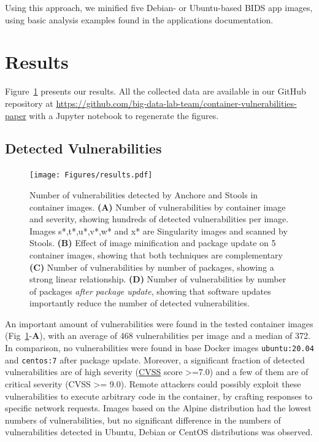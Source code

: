 \documentclass[a4paper,num-refs]{oup-contemporary}
\begin{document}
Using this approach, we minified five Debian- or Ubuntu-based BIDS app images,
using basic analysis examples found in the applications documentation.

\section{Results}

Figure~\ref{fig:vulnerabilities} presents our results. All the collected
data are available in our GitHub repository at
\url{https://github.com/big-data-lab-team/container-vulnerabilities-paper}
with a Jupyter notebook to regenerate the figures. 

\subsection{Detected Vulnerabilities}


\begin{figure}
\texttt{[image: Figures/results.pdf]}
\caption{\label{fig:vulnerabilities} Number of vulnerabilities detected by
Anchore and Stools in container images. \textbf{(A)} Number of vulnerabilities by
container image and severity, showing hundreds of detected vulnerabilities
per image. Images s*,t*,u*,v*,w* and x* are Singularity images and scanned by Stools. \textbf{(B)} Effect of image minification and
package update on 5 container images, showing that both techniques are
complementary \textbf{(C)} Number of vulnerabilities by number of
packages, showing a strong linear relationship. \textbf{(D)} Number of
vulnerabilities by number of packages \emph{after package update}, showing that software updates 
importantly reduce the number of detected vulnerabilities.}
\end{figure}

An important amount of vulnerabilities were found in the tested container
 images (Fig~\ref{fig:vulnerabilities}-\textbf{A}), with an average of 468 vulnerabilities
  per image and a median of 372. In comparison, no vulnerabilities were found in base
 Docker images \texttt{ubuntu:20.04} and \texttt{centos:7} after package
 update. Moreover, a significant fraction of detected vulnerabilities are
 of high severity
 (\href{https://www.first.org/cvss/specification-document}{CVSS} score
 >=7.0) and a few of them are of critical severity (CVSS >= 9.0). Remote
 attackers could possibly exploit these vulnerabilities to execute
 arbitrary code in the container, by crafting responses to specific network
 requests. Images based on the Alpine distribution 
 had the lowest numbers of vulnerabilities, but no significant difference
 in the numbers of vulnerabilities detected in 
 Ubuntu, Debian or CentOS distributions was observed.
\end{document}
